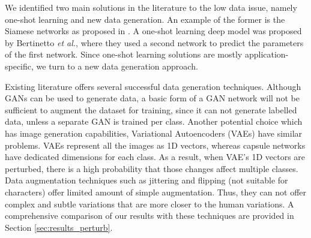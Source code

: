 
We identified two main solutions in the literature to the low data issue, namely one-shot learning and new data generation. An example of the former is the Siamese networks as proposed in \cite{Koch2015SiameseNN}. A one-shot learning deep model was proposed by Bertinetto \textit{et al.}\cite{DBLP:journals/corr/BertinettoHVTV16}, where they used a second network to predict the parameters of the first network. Since one-shot learning solutions are mostly application-specific, we turn to a new data generation approach.

Existing literature offers several successful data generation techniques. Although GANs \cite{goodfellow2014generative} can be used to generate data, a basic form of a GAN network will not be sufficient to augment the dataset for training, since it can not generate labelled data, unless a separate GAN is trained per class.
Another potential choice which has image generation capabilities, Variational Autoencoders (VAEs) \cite{doersch2016tutorial} have similar problems. VAEs represent all the images as 1D vectors,
whereas capsule networks have dedicated dimensions for each class. As a result, when VAE’s 1D vectors are perturbed, there is a high probability that those changes affect multiple classes. 
Data augmentation techniques such as jittering and flipping (not
suitable for characters) offer limited amount of simple augmentation. Thus, they can not offer complex and subtle variations that are more closer to the human variations. A comprehensive comparison of our results with these techniques are provided in Section \ref{sec:results_perturb}.